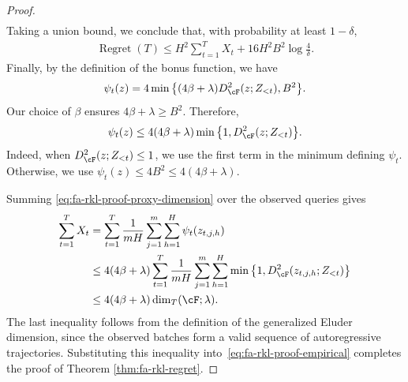 \documentclass[11pt]{article}
\begin{document}
\begin{proof}
\begin{align}
    \label{eq:fa-rkl-proof-concentration}
\end{align}
Taking a union bound, we conclude that, with
probability at least $1-\delta$,
\begin{align}
    \operatorname{Regret}(T)
    \leq
    H^2\sum_{t=1}^T X_t
    +
    16H^2B^2\log\frac4\delta.
    \label{eq:fa-rkl-proof-empirical}
\end{align}
Finally, by the definition of the bonus function, we have
\begin{align*}
    \psi_t(z)
    =
    4\min\big\{
        (4\beta+\lambda)
        D_{\cF}^2(z;Z_{<t}),
        B^2
    \big\}.
\end{align*}
Our choice of $\beta$ ensures $4\beta+\lambda\geq B^2$.
Therefore,
\begin{align}
    \psi_t(z)
    \leq
    4(4\beta+\lambda)
    \min\big\{1,D_{\cF}^2(z;Z_{<t})\big\}.
    \label{eq:fa-rkl-proof-proxy-dimension}
\end{align}
Indeed, when $D_{\cF}^2(z;Z_{<t})\leq1$, we use the
first term in the minimum defining $\psi_t$.
Otherwise, we use $\psi_t(z)\leq4B^2\leq4(4\beta+\lambda)$.

Summing \eqref{eq:fa-rkl-proof-proxy-dimension}
over the observed queries gives
\begin{align*}
    \sum_{t=1}^T X_t
    &=
    \sum_{t=1}^T
    \frac1{mH}\sum_{j=1}^m\sum_{h=1}^H
    \psi_t(z_{t,j,h})\\
    &\leq
    4(4\beta+\lambda)
    \sum_{t=1}^T
    \frac1{mH}\sum_{j=1}^m\sum_{h=1}^H
    \min\big\{
        1,
        D_{\cF}^2(z_{t,j,h};Z_{<t})
    \big\}\\
    &\leq
    4(4\beta+\lambda)
    \dim_T(\cF;\lambda).
\end{align*}
The last inequality follows from the definition of the generalized Eluder dimension, since the observed batches form a valid sequence of autoregressive trajectories. Substituting this inequality into~\eqref{eq:fa-rkl-proof-empirical} completes the proof of Theorem \ref{thm:fa-rkl-regret}.
\end{proof}
\end{document}
